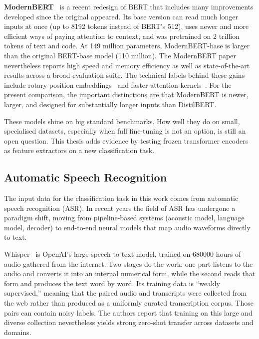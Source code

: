 \textbf{ModernBERT}~\cite{warner2024modernbert} is a recent redesign of BERT that includes many improvements developed since the original appeared. Its base version can read much longer inputs at once (up to 8192 tokens instead of BERT's 512), uses newer and more efficient ways of paying attention to context, and was pretrained on 2 trillion tokens of text and code. At 149 million parameters, ModernBERT-base is larger than the original BERT-base model (110 million). The ModernBERT paper nevertheless reports high speed and memory efficiency as well as state-of-the-art results across a broad evaluation suite. The technical labels behind these gains include rotary position embeddings~\cite{su2024roformer} and faster attention kernels~\cite{dao2022flashattention}. For the present comparison, the important distinctions are that ModernBERT is newer, larger, and designed for substantially longer inputs than DistilBERT.

These models shine on big standard benchmarks. How well they do on small, specialised datasets, especially when full fine-tuning is not an option, is still an open question. This thesis adds evidence by testing frozen transformer encoders as feature extractors on a new classification task.

\subsection{Automatic Speech Recognition}
\label{sec:asr}

The input data for the classification task in this work comes from automatic speech recognition (ASR). In recent years the field of ASR has undergone a paradigm shift, moving from pipeline-based systems (acoustic model, language model, decoder) to end-to-end neural models that map audio waveforms directly to text.

Whisper~\cite{radford2023whisper} is OpenAI's large speech-to-text model, trained on 680000 hours of audio gathered from the internet. Two stages do the work: one part listens to the audio and converts it into an internal numerical form, while the second reads that form and produces the text word by word. Its training data is ``weakly supervised,'' meaning that the paired audio and transcripts were collected from the web rather than produced as a uniformly curated transcription corpus. Those pairs can contain noisy labels. The authors report that training on this large and diverse collection nevertheless yields strong zero-shot transfer across datasets and domains.

